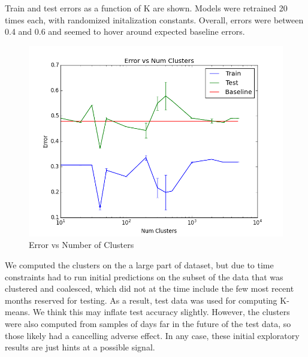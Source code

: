 Train and test errors as a function of K are shown. Models were retrained 20 times each, with randomized initalization constants. Overall, errors were between 0.4 and 0.6 and seemed to hover around expected baseline errors. 


\begin{figure}[ht]
\vskip 0.2in
\begin{center}
\centerline{\includegraphics[scale=0.15]{images/error_v_k.png}}
\caption{Error vs Number of Clusters}
\end{center}
\vskip -0.2in
\label{fig:error_v_k}
\end{figure} 

We computed the clusters on the a large part of dataset, but due to time constraints had to run initial predictions on the subset of the data that was clustered and coalesced, which did not at the time include the few most recent months reserved for testing. As a result, test data was used for computing K-means. We think this may inflate test accuracy slightly. However, the clusters were also computed from samples of days far in the future of the test data, so those likely had a cancelling adverse effect. In any case, these initial exploratory results are just hints at a possible signal.
